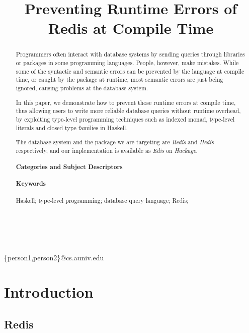 \documentclass[pldi]{sigplanconf-pldi16}
\begin{document}
\title{Preventing Runtime Errors of Redis at Compile Time}

%
%

{ \\
  \\
}
{\{person1,person2\}@cs.auniv.edu}

\maketitle

\begin{abstract}
Programmers often interact with database systems by sending queries through libraries or packages in some programming languages. People, however, make mistakes.
While some of the syntactic and semantic errors can be prevented by the
 language at compile time, or caught by the package at runtime, most semantic
 errors are just being ignored, causing problems at the database system.

In this paper, we demonstrate how to prevent those runtime errors at compile
 time, thus allowing users to write more reliable database queries without
 runtime overhead, by exploiting type-level programming techniques such as
 indexed monad, type-level literals and closed type families in Haskell.

The database system and the package we are targeting are \emph{Redis} and
 \emph{Hedis} respectively, and our implementation is available as \emph{Edis}
 on \emph{Hackage}.

\paragraph{Categories and Subject Descriptors}
\paragraph{Keywords}
Haskell; type-level programming; database query language; Redis;
\end{abstract}

\section{Introduction}

\subsection{Redis}
\end{document}
